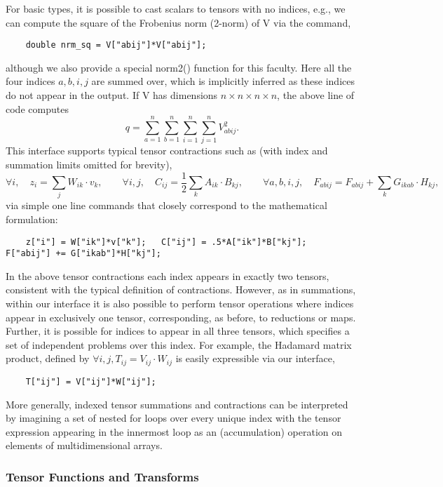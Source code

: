 For basic types, it is possible to cast scalars to tensors with no indices, e.g., we can compute the square of the Frobenius norm (2-norm) of {\CD V} via the command,
\begin{lstlisting}
    double nrm_sq = V["abij"]*V["abij"];
\end{lstlisting}
although we also provide a special {\kwstyle norm2()} function for this faculty.
Here all the four indices $a,b,i,j$ are summed over, which is implicitly inferred as these indices do not appear in the output.
If {\CD V} has dimensions $n\times n\times n \times n$, the above line of code computes
\[q = \sum_{a=1}^n\sum_{b=1}^n\sum_{i=1}^n\sum_{j=1}^n V_{abij}^2.\]
This interface supports typical tensor contractions such as (with index and summation limits omitted for brevity),
\[\forall i,\quad z_i = \sum_j W_{ik}\cdot v_k, \quad\quad 
  \forall i,j, \quad C_{ij} = \frac{1}{2}\sum_k A_{ik}\cdot B_{kj}, \quad\quad 
  \forall a,b,i,j, \quad F_{abij} = F_{abij} + \sum_k G_{ikab}\cdot H_{kj},\]
via simple one line commands that closely correspond to the mathematical formulation:
\begin{lstlisting}
    z["i"] = W["ik"]*v["k"];   C["ij"] = .5*A["ik"]*B["kj"];   F["abij"] += G["ikab"]*H["kj"];
\end{lstlisting}
In the above tensor contractions each index appears in exactly two tensors, consistent with the typical definition of contractions.
However, as in summations, within our interface it is also possible to perform tensor operations where indices appear in exclusively one tensor, corresponding, as before, to reductions or maps.
Further, it is possible for indices to appear in all three tensors, which specifies a set of independent problems over this index.
For example, the Hadamard matrix product, defined by
\(\forall i,j, T_{ij} = V_{ij}\cdot W_{ij}\)
is easily expressible via our interface,
\begin{lstlisting}
    T["ij"] = V["ij"]*W["ij"];
\end{lstlisting}
More generally, indexed tensor summations and contractions can be interpreted by imagining a set of nested for loops over every unique index with the tensor expression appearing in the innermost loop as an (accumulation) operation on elements of multidimensional arrays.




\subsubsection{Tensor Functions and Transforms}


